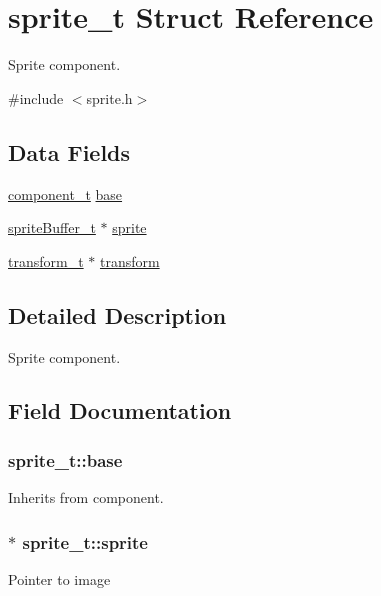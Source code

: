 \hypertarget{structsprite__t}{}\section{sprite\+\_\+t Struct Reference}
\label{structsprite__t}


Sprite component.  




{\ttfamily \#include $<$sprite.\+h$>$}

\subsection*{Data Fields}
\begin{DoxyCompactItemize}
\item 
\hyperlink{structcomponent__t}{component\+\_\+t} \hyperlink{structsprite__t_a64251931f050210a69a96ecf6738557b}{base}
\item 
\hyperlink{structsprite_buffer__t}{sprite\+Buffer\+\_\+t} $\ast$ \hyperlink{structsprite__t_a6aac03efd327d7ae0eda32e7aaa3083f}{sprite}
\item 
\hyperlink{structtransform__t}{transform\+\_\+t} $\ast$ \hyperlink{structsprite__t_a75832530a950033696778cb7f566b357}{transform}
\end{DoxyCompactItemize}


\subsection{Detailed Description}
Sprite component. 

\subsection{Field Documentation}
\subsubsection[{\texorpdfstring{base}{base}}]{ sprite\+\_\+t\+::base}\hypertarget{structsprite__t_a64251931f050210a69a96ecf6738557b}{}\label{structsprite__t_a64251931f050210a69a96ecf6738557b}
Inherits from component. 
\subsubsection[{\texorpdfstring{sprite}{sprite}}]{$\ast$ sprite\+\_\+t\+::sprite}\hypertarget{structsprite__t_a6aac03efd327d7ae0eda32e7aaa3083f}{}\label{structsprite__t_a6aac03efd327d7ae0eda32e7aaa3083f}
Pointer to image 
